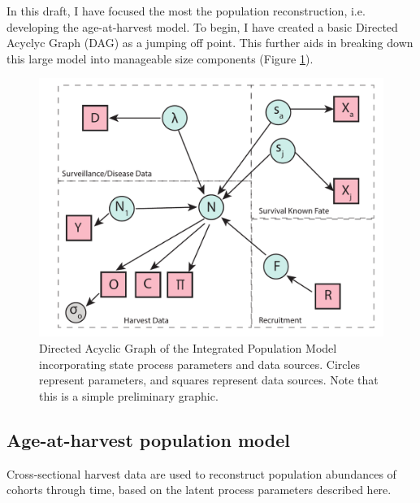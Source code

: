 \documentclass[12pt]{article}\usepackage[]{graphicx}\usepackage[]{color}
\begin{document}
In this draft, I have focused the most the population reconstruction, i.e. developing the age-at-harvest model. To begin, I have created a basic Directed Acyclyc Graph (DAG) as a jumping off point. This further aids in breaking down this large model into manageable size components (Figure \ref{fig:dag}).\\ 
\begin{figure}
\begin{center}
\includegraphics[width=10 in]{IPM_dag}
\caption{Directed Acyclic Graph of the Integrated Population Model incorporating state process parameters and data sources. Circles represent parameters, and squares represent data sources. Note that this is a simple preliminary graphic.}\label{fig:dag}
\end{center}
\end{figure}
\newpage
\subsection{Age-at-harvest population model}
Cross-sectional harvest data are used to reconstruct population abundances of cohorts through time, based on the latent process parameters described here.
\end{document}
